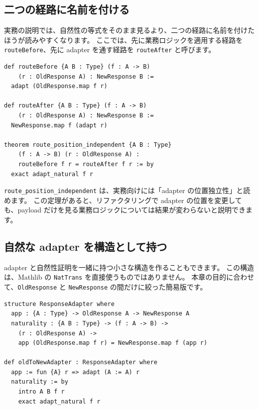 \subsection{二つの経路に名前を付ける}

実務の説明では、自然性の等式をそのまま見るより、二つの経路に名前を付けたほうが読みやすくなります。
ここでは、先に業務ロジックを適用する経路を \texttt{routeBefore}、先に adapter を通す経路を \texttt{routeAfter} と呼びます。

\begin{listing}[htbp]
\begin{verbatim}
def routeBefore {A B : Type} (f : A -> B)
    (r : OldResponse A) : NewResponse B :=
  adapt (OldResponse.map f r)

def routeAfter {A B : Type} (f : A -> B)
    (r : OldResponse A) : NewResponse B :=
  NewResponse.map f (adapt r)

theorem route_position_independent {A B : Type}
    (f : A -> B) (r : OldResponse A) :
    routeBefore f r = routeAfter f r := by
  exact adapt_natural f r
\end{verbatim}
\caption{\texttt{routeBefore} と \texttt{routeAfter}}
\label{lst:ch31-routes}
\end{listing}

\texttt{route\_position\_independent} は、実務向けには「adapter の位置独立性」と読めます。
この定理があると、リファクタリングで adapter の位置を変更しても、payload だけを見る業務ロジックについては結果が変わらないと説明できます。

\subsection{自然な adapter を構造として持つ}

adapter と自然性証明を一緒に持つ小さな構造を作ることもできます。
この構造は、Mathlib の \texttt{NatTrans} を直接使うものではありません。
本章の目的に合わせて、\texttt{OldResponse} と \texttt{NewResponse} の間だけに絞った簡易版です。

\begin{listing}[htbp]
\begin{verbatim}
structure ResponseAdapter where
  app : {A : Type} -> OldResponse A -> NewResponse A
  naturality : {A B : Type} -> (f : A -> B) ->
    (r : OldResponse A) ->
    app (OldResponse.map f r) = NewResponse.map f (app r)

def oldToNewAdapter : ResponseAdapter where
  app := fun {A} r => adapt (A := A) r
  naturality := by
    intro A B f r
    exact adapt_natural f r
\end{verbatim}
\caption{\texttt{ResponseAdapter}}
\label{lst:ch31-response-adapter}
\end{listing}


